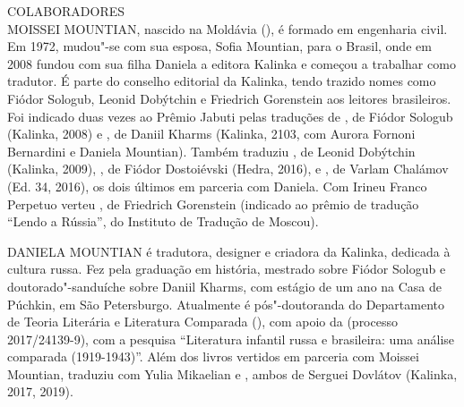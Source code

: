 \clearpage
\thispagestyle{empty}

\movetoevenpage
\small\MyriadPro\itshape
\label{colaboradores}

\noindent{}COLABORADORES\\

\noindent{}MOISSEI MOUNTIAN, nascido na Moldávia (\scalebox{.8}{URSS}), é formado em engenharia civil. Em 1972, mudou"-se com sua esposa, Sofia Mountian, para o Brasil,
onde em 2008 fundou com sua filha Daniela a editora Kalinka e começou a
trabalhar como tradutor. É parte do conselho editorial da Kalinka, tendo
trazido nomes como Fiódor Sologub, Leonid Dobýtchin e Friedrich
Gorenstein aos leitores brasileiros. Foi indicado duas vezes ao Prêmio
Jabuti pelas traduções de {}, de Fiódor Sologub
(Kalinka, 2008) e {}, de Daniil Kharms (Kalinka, 2103, com Aurora Fornoni
Bernardini e Daniela Mountian). Também traduziu {}, de Leonid Dobýtchin (Kalinka, 2009), {}, de Fiódor Dostoiévski
(Hedra, 2016), e {}, de
Varlam Chalámov (Ed. 34, 2016), os dois últimos em parceria com Daniela.
Com Irineu Franco Perpetuo verteu {}, de Friedrich Gorenstein
(indicado ao prêmio de tradução “Lendo a Rússia”, do Instituto de
Tradução de Moscou).

\medskip

\noindent{}DANIELA MOUNTIAN é tradutora, designer e criadora da Kalinka, de­dicada
à cultura russa. Fez pela \scalebox{0.8}{USP} graduação em história, mestrado sobre
Fiódor Sologub e doutorado"-sanduíche sobre Daniil Kharms, com estágio de
um ano na Casa de Púchkin, em São Petersburgo. Atualmente é
pós"-doutoranda do Departamento de Teoria Literária e Literatura
Comparada (\scalebox{0.8}{USP}), com apoio da \scalebox{0.8}{FAPESP} (processo 2017/24139-9), com a pesquisa “Literatura infantil
russa e brasileira: uma análise comparada (1919-1943)”. Além dos livros
vertidos em parceria com Moissei Mountian, traduziu com Yulia Mikaelian
{} e {}, ambos de Serguei Dovlátov
(Kalinka, 2017, 2019).


\medskip

